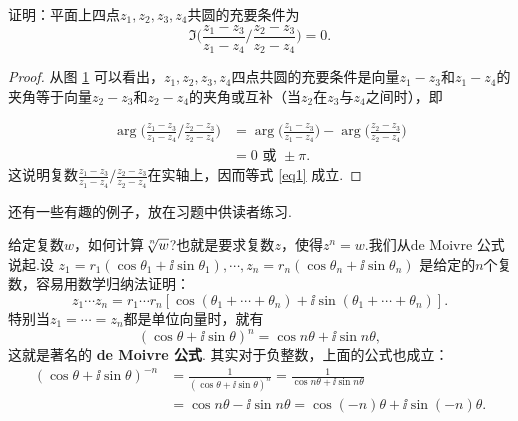 \begin{example}
  证明：平面上四点$z_1,z_2,z_3,z_4$共圆的充要条件为
  \begin{equation}\label{eq1}
    \Im\bigg( \frac{z_1-z_3}{z_1-z_4} \bigg/ \frac{z_2-z_3}{z_2-z_4} \bigg)=0.
  \end{equation}
\end{example}
\begin{proof}
  从图 \ref{fig1.4} 可以看出，$z_1,z_2,z_3,z_4$四点共圆的充要条件是向量$z_1-z_3$和$z_1-z_4$的夹角等于向量$z_2-z_3$和$z_2-z_4$的夹角或互补（当$z_2$在$z_3$与$z_4$之间时），即
  \begin{figure}
    \centering
    \caption{\label{fig1.4}}
  \end{figure}
  \begin{align*}
    \arg\bigg( \frac{z_1-z_3}{z_1-z_4} \bigg/ \frac{z_2-z_3}{z_2-z_4} \bigg)
    & = \arg\bigg( \frac{z_1-z_3}{z_1-z_4} \bigg) - \arg\bigg( \frac{z_2-z_3}{z_2-z_4} \bigg)\\
    & = 0 \text{ 或 }\pm\pi.
  \end{align*}
  这说明复数$\frac{z_1-z_3}{z_1-z_4}\bigg/\frac{z_2-z_3}{z_2-z_4}$在实轴上，因而等式 \eqref{eq1} 成立.
\end{proof}


还有一些有趣的例子，放在习题中供读者练习.

给定复数$w$，如何计算$\sqrt[\leftroot{-1}\uproot{2} n]{w}$?也就是要求复数$z$，使得$z^n=w$.我们从de Moivre 公式说起.设
$z_1=r_1(\cos\theta_1+\ii\sin\theta_1),\cdots,z_n=r_n(\cos\theta_n+\ii\sin\theta_n)$
是给定的$n$个复数，容易用数学归纳法证明：
\[
  z_1 \cdots z_n = r_1 \cdots r_n[ \cos(\theta_1 + \cdots + \theta_n) + \ii\sin(\theta_1 + \cdots + \theta_n) ].
\]
特别当$z_1=\cdots=z_n$都是单位向量时，就有
\[
  (\cos\theta + \ii\sin\theta)^n = \cos n\theta + \ii\sin n\theta,
\]
这就是著名的 \textbf{de Moivre 公式}. 其实对于负整数，上面的公式也成立：
\begin{align*}
  (\cos\theta + \ii\sin\theta)^{-n} & = \frac1{(\cos\theta + \ii\sin\theta)^n}
  = \frac1{\cos n\theta + \ii\sin n\theta}\\
  & = \cos n\theta - \ii\sin n\theta = \cos(-n)\theta + \ii\sin(-n)\theta.
\end{align*}

